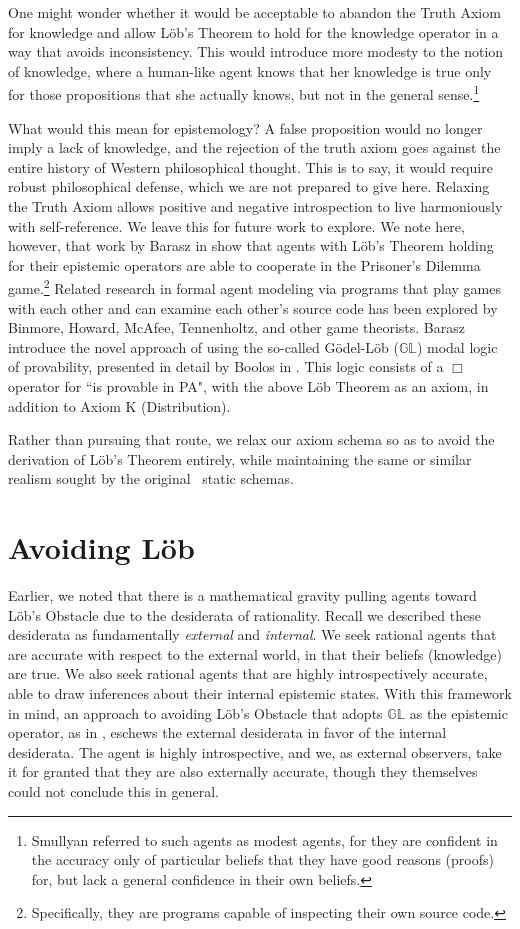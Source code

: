 One might wonder whether it would be acceptable to abandon the Truth Axiom for knowledge and allow L\"ob's Theorem to hold for the knowledge operator in a way that avoids inconsistency. This would introduce more modesty to the notion of knowledge, where a human-like agent knows that her knowledge is true only for those propositions that she actually knows, but not in the general sense.\footnote{Smullyan referred to such agents as modest agents, for they are confident in the accuracy only of particular beliefs that they have good reasons (proofs) for, but lack a general confidence in their own beliefs.} 

What would this mean for epistemology? A false proposition would no longer imply a lack of knowledge, and the rejection of the truth axiom goes against the entire history of Western philosophical thought. This is to say, it would require robust philosophical defense, which we are not prepared to give here. Relaxing the Truth Axiom allows positive and negative introspection to live harmoniously with self-reference. We leave this for future work to explore. We note here, however, that work by Barasz \etal in \cite{modal_prisoner} show that agents with L\"ob's Theorem holding for their epistemic operators are able to cooperate in the Prisoner's Dilemma game.\footnote{Specifically, they are programs capable of inspecting their own source code.} Related research in formal agent modeling via programs that play games with each other and can examine each other's source code has been explored by Binmore, Howard, McAfee, Tennenholtz, and other game theorists. Barasz \etal introduce the novel approach of using the so-called G\"odel-L\"ob ($\mathbb{GL}$) modal logic of provability, presented in detail by Boolos in \cite{Boolos}. This logic consists of a $\Box$ operator for ``is provable in PA", with the above L\"ob Theorem as an axiom, in addition to Axiom K (Distribution).

Rather than pursuing that route, we relax our axiom schema so as to avoid the derivation of L\"ob's Theorem entirely, while maintaining the same or similar realism sought by the original \DASL\ static schemas.

\section{Avoiding L\"ob}
\label{sec:avoiding_lob}
Earlier, we noted that there is a mathematical gravity pulling agents toward L\"ob's Obstacle due to the desiderata of rationality. Recall we described these desiderata as fundamentally \emph{external} and \emph{internal}. We seek rational agents that are accurate with respect to the external world, in that their beliefs (knowledge) are true. We also seek rational agents that are highly introspectively accurate, able to draw inferences about their internal epistemic states. With this framework in mind, an approach to avoiding L\"ob's Obstacle that adopts $\mathbb{GL}$ as the epistemic operator, as in \cite{modal_prisoner}, eschews the external desiderata in favor of the internal desiderata. The agent is highly introspective, and we, as external observers, take it for granted that they are also externally accurate, though they themselves could not conclude this in general.

